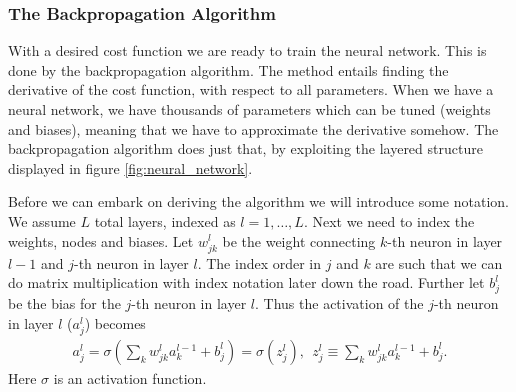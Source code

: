 \documentclass[12pt]{extarticle}
\begin{document}
\subsubsection{The Backpropagation Algorithm} \label{sec:back_prop}
With a desired cost function we are ready to train the neural network. This is done by the backpropagation algorithm. The method entails finding the derivative of the cost function, with respect to all parameters. When we have a neural network, we have thousands of parameters which can be tuned (weights and biases), meaning that we have to approximate the derivative somehow. The backpropagation algorithm does just that, by exploiting the layered structure displayed in figure \ref{fig:neural_network}.

Before we can embark on deriving the algorithm we will introduce some notation. We assume $L$ total layers, indexed as $l = 1, \dots , L$. Next we need to index the weights, nodes and biases. Let $w_{jk}^l$ be the weight connecting $k$-th neuron in layer $l-1$ and $j$-th neuron in layer $l$. The index order in $j$ and $k$ are such that we can do matrix multiplication with index notation later down the road. Further let $b_j^l$ be the bias for the $j$-th neuron in layer $l$. Thus the activation of the $j$-th neuron in layer $l$ ($a^l_j$) becomes
\begin{align}
	a_j^l = \sigma\left(\sum_{k} w_{jk}^l a_k^{l-1} + b_j^l\right) = \sigma(z_j^l), \ \ z_j^l \equiv \sum_{k} w_{jk}^l a_k^{l-1} + b_j^l.
	\label{eq:activation_of_node_ajl}
\end{align}
Here $\sigma$ is an activation function.
\end{document}
